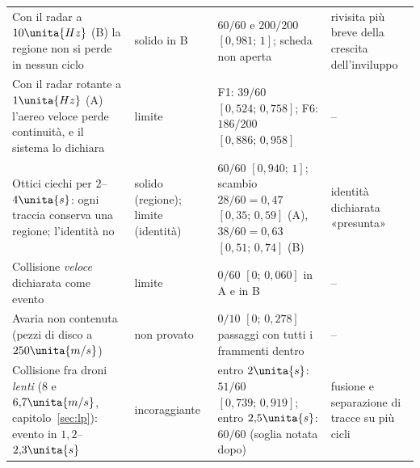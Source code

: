 \begin{table}[H]
\begin{tabularx}{\linewidth}{@{}>{\RaggedRight\arraybackslash}p{5.3cm}>{\RaggedRight\arraybackslash}p{2.0cm}>{\RaggedRight\arraybackslash}p{4.2cm}L@{}}
Con il radar a $10\unita{Hz}$ (B) la regione non si perde in nessun ciclo & solido in B & $60/60$ e $200/200$ $[0{,}981;\,1]$; scheda non aperta & rivisita più breve della crescita dell'inviluppo\\
Con il radar rotante a $1\unita{Hz}$ (A) l'aereo veloce perde continuità, e il sistema lo dichiara & limite & F1: $39/60$ $[0{,}524;\,0{,}758]$; F6: $186/200$ $[0{,}886;\,0{,}958]$ & --\\
Ottici ciechi per $2$--$4\unita{s}$: ogni traccia conserva una regione; l'identità no & solido (regione); limite (identità) & $60/60$ $[0{,}940;\,1]$; scambio $28/60=0{,}47$ $[0{,}35;\,0{,}59]$ (A), $38/60=0{,}63$ $[0{,}51;\,0{,}74]$ (B) & identità dichiarata «presunta»\\
Collisione \emph{veloce} dichiarata come evento & limite & $0/60$ $[0;\,0{,}060]$ in A e in B & --\\
Avaria non contenuta (pezzi di disco a $250\unita{m/s}$) & non provato & $0/10$ $[0;\,0{,}278]$ passaggi con tutti i frammenti dentro & --\\
Collisione fra droni \emph{lenti} ($8$ e $6{,}7\unita{m/s}$, capitolo~\ref{sec:lp}): evento in $1{,}2$--$2{,}3\unita{s}$ & incoraggiante & entro $2\unita{s}$: $51/60$ $[0{,}739;\,0{,}919]$; entro $2{,}5\unita{s}$: $60/60$ (soglia notata dopo) & fusione e separazione di tracce su più cicli\\
\bottomrule
\end{tabularx}
\end{table}

